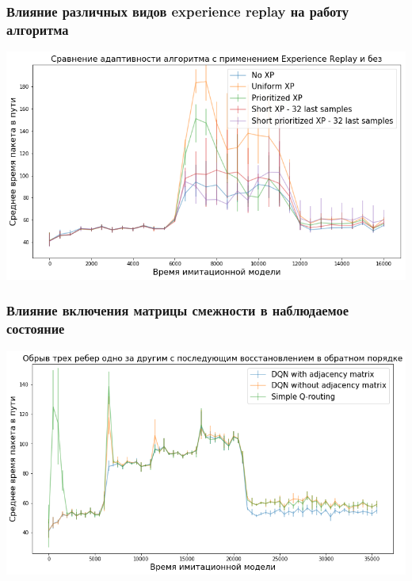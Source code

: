 \documentclass{beamer}
\begin{document}
\begin{frame}
  \frametitle{Влияние различных видов experience replay на работу алгоритма}
  \includegraphics[width=\textwidth]{experiments-xp-variants}
\end{frame}

\begin{frame}
  \frametitle{Влияние включения матрицы смежности в наблюдаемое состояние}
  \includegraphics[width=\textwidth]{experiment-with-without-amatrix}
\end{frame}
\end{document}
